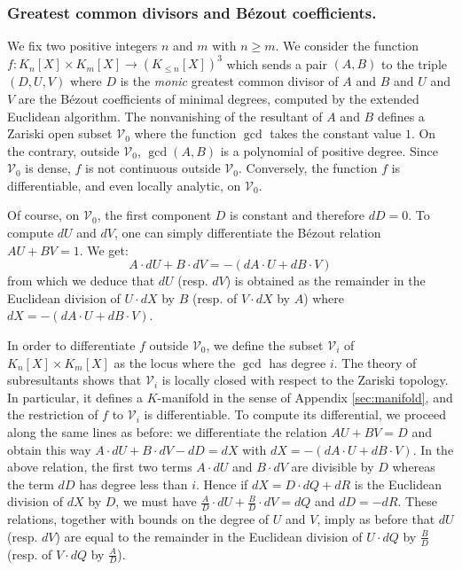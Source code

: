 \documentclass{lms}
\begin{document}
\subsubsection*{Greatest common divisors and B\'ezout coefficients.}

We fix two positive integers $n$ and $m$ with $n \geq m$. We consider the 
function $f : K_n[X] \times K_m[X] \to (K_{\leq n}[X])^3$ which sends a 
pair $(A,B)$ to the triple $(D, U, V)$ where $D$ is the \emph{monic} 
greatest common divisor of $A$ and $B$ and $U$ and $V$ are the B\'ezout 
coefficients of minimal degrees, computed by the extended 
Euclidean algorithm.
The nonvanishing of the resultant of $A$ and $B$ defines a Zariski open 
subset $\mathcal V_0$ where the function $\gcd$ takes the constant value 
$1$. On the contrary, outside $\mathcal V_0$, $\gcd(A,B)$ is a polynomial 
of positive degree.  Since $\mathcal V_0$ is dense, $f$ is not continuous outside 
$\mathcal V_0$. Conversely, the function $f$ is differentiable, and even locally analytic,
on $\mathcal V_0$.

Of course, on $\mathcal V_0$, the first component $D$ is constant and 
therefore $dD = 0$. To compute $dU$ and $dV$, one can simply 
differentiate the B\'ezout relation $AU + BV = 1$. We get:
$$A \cdot dU + B \cdot dV = - (dA \cdot U + dB \cdot V)$$
from which we deduce that $dU$ (resp. $dV$) is obtained as the 
remainder in the Euclidean division of $U{\cdot}dX$ by $B$ (resp. of 
$V{\cdot}dX$ by $A$) where $dX = - (dA \cdot U + dB \cdot V)$.

In order to differentiate $f$ outside $\mathcal V_0$, we 
define the subset $\mathcal V_i$ of $K_n[X] \times 
K_m[X]$ as the locus where the $\gcd$ has degree $i$. The theory of 
subresultants shows that $\mathcal V_i$ is locally closed with respect to 
the Zariski topology. In particular, it defines a $K$-manifold in the 
sense of Appendix \ref{sec:manifold}, and the 
restriction of $f$ to $\mathcal V_i$ is differentiable. To compute
its differential, we proceed along the same lines as before: we 
differentiate the relation $AU + BV = D$ and obtain this way
$A \cdot dU + B \cdot dV - dD = dX$
with $dX = - (dA \cdot U + dB \cdot V)$. In the above relation, the
first two terms $A{\cdot}dU$ and $B{\cdot}dV$ are divisible by $D$ 
whereas the term $dD$ has degree less than $i$. 
Hence if $dX = D \cdot dQ + dR$ is the Euclidean division of $dX$ by $D$, 
we must have $\frac A D \cdot dU + \frac B D \cdot dV = dQ$ and $dD = 
-dR$. These relations, together with bounds on the degree of $U$ and $V$,
imply as before that $dU$ (resp. $dV$) are equal to the remainder in the
Euclidean division of $U{\cdot}dQ$ by $\frac B D$ (resp. of $V{\cdot}dQ$
by $\frac A D$).
\end{document}
